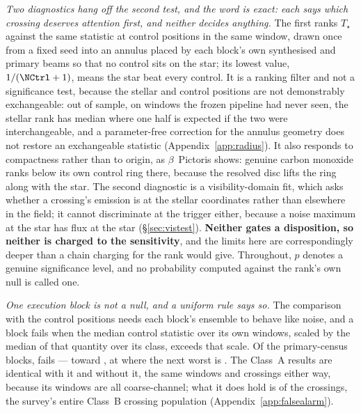\emph{Two diagnostics hang off the second test, and the word is exact: each
says which crossing deserves attention first, and neither decides anything.}
The first ranks $T_\star$ against the same statistic at \NCtrl{} control
positions in the same window, drawn once from a fixed seed into an annulus
placed by each block's own synthesised and primary beams so that no control
sits on the star; its lowest value, $1/(\NCtrl+1)$, means the star beat every
control. It is a ranking filter and not a significance test, because the
stellar and control positions are not demonstrably exchangeable: out of
sample, on \HoWin{} windows the frozen pipeline had never seen, the stellar
rank has median \HoRankMed{} where one half is expected if the two were
interchangeable, and a parameter-free correction for the annulus geometry
does not restore an exchangeable statistic (Appendix~\ref{app:radius}). It
also responds to compactness rather than to origin, as $\beta$~Pictoris
shows: genuine carbon monoxide ranks below its own control ring there,
because the resolved disc lifts the ring along with the star. The second
diagnostic is a visibility-domain fit, which asks whether a crossing's
emission is at the stellar coordinates rather than elsewhere in the field; it
cannot discriminate at the trigger either, because a noise maximum at the
star has flux at the star (\S\ref{sec:vistest}). \textbf{Neither gates a
disposition, so neither is charged to the sensitivity}, and the limits here
are correspondingly deeper than a chain charging for the rank would give.
Throughout, $p$ denotes a genuine significance level, and no probability
computed against the rank's own null is called one.

\emph{One execution block is not a null, and a uniform rule says so.}
The comparison with the control positions needs each block's ensemble to behave
like noise, and a block fails when the median control statistic over its own
windows, scaled by the median of that quantity over its class, exceeds
\BqFactor{} that scale. Of the \BqNBlocks{} primary-census blocks, \BqNFail{}
fails --- \BqFailBlock{} toward \BqFailStar, at \BqFailQ{} where the next worst
is \BqNextQ. The Class~A results are identical with it and without it,
the same \BqWinACut{} windows and \BqXrossACut{} crossings either way, because
its \BqFailNWin{} windows are all coarse-channel; what it does hold is
\BqFailNCross{} of the \NCross{} crossings, the survey's entire Class~B
crossing population (Appendix~\ref{app:falsealarm}).

